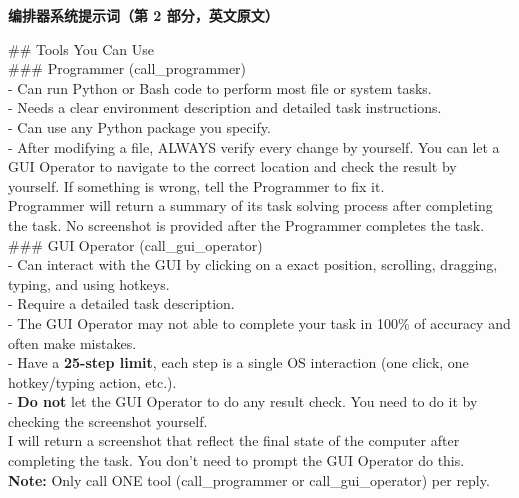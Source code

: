 \documentclass{article} %
\begin{document}
\begin{table}[t]
\begin{tcolorbox} [colback=yellow!10]
{\bf 编排器系统提示词（第 2 部分，英文原文）}

\tcblower
\#\# Tools You Can Use\\

\#\#\# Programmer (call\_programmer)\\
- Can run Python or Bash code to perform most file or system tasks.\\
- Needs a clear environment description and detailed task instructions.\\
- Can use any Python package you specify.\\
- After modifying a file, ALWAYS verify every change by yourself. You can let a GUI Operator to navigate to the correct location and check the result by yourself. If something is wrong, tell the Programmer to fix it.\\
Programmer will return a summary of its task solving process after completing the task. No screenshot is provided after the Programmer completes the task.\\

\#\#\# GUI Operator (call\_gui\_operator)\\
- Can interact with the GUI by clicking on a exact position, scrolling, dragging, typing, and using hotkeys.\\
- Require a detailed task description.\\
- The GUI Operator may not able to complete your task in 100\% of accuracy and often make mistakes. \\
- Have a \textbf{25-step limit}, each step is a single OS interaction (one click, one hotkey/typing action, etc.).\\
- \textbf{Do not} let the GUI Operator to do any result check. You need to do it by checking the screenshot yourself.\\
I will return a screenshot that reflect the final state of the computer after completing the task. You don't need to prompt the GUI Operator do this.\\

\textbf{Note:} Only call ONE tool (call\_programmer or call\_gui\_operator) per reply.
\end{tcolorbox}
\caption{\label{tab:prompt-orchestrator-2}编排器系统提示词（第 2 部分，保留英文原文）。}
\end{table}
\end{document}
